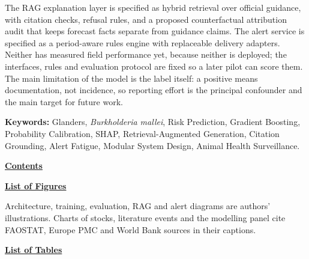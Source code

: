\documentclass[10pt,openany]{report}
\begin{document}
\vspace{0.5em}
\noindent
The RAG explanation layer is specified as hybrid retrieval over official guidance, with citation
checks, refusal rules, and a proposed counterfactual attribution audit that keeps forecast facts
separate from guidance claims. The alert service is specified as a period-aware rules engine with
replaceable delivery adapters. Neither has measured field performance yet, because neither is
deployed; the interfaces, rules and evaluation protocol are fixed so a later pilot can score them.
The main limitation of the model is the label itself: a positive means documentation, not incidence,
so reporting effort is the principal confounder and the main target for future work.

\vspace{0.7em}
\noindent
\textbf{Keywords:} Glanders, \textit{Burkholderia mallei}, Risk Prediction, Gradient Boosting,
Probability Calibration, SHAP, Retrieval-Augmented Generation, Citation Grounding, Alert Fatigue,
Modular System Design, Animal Health Surveillance.

\newpage
\pagestyle{plain}
\noindent\underline{\textbf{Contents}}
\vspace{0.55cm}

\makeatletter
{}
\makeatother

\newpage
\noindent\underline{\textbf{List of Figures}}
\vspace{0.55cm}

{\small
Architecture, training, evaluation, RAG and alert diagrams are authors' illustrations.
Charts of stocks, literature events and the modelling panel cite FAOSTAT, Europe PMC and
World Bank sources in their captions.
\par}
\vspace{0.45cm}

\makeatletter
{}
\makeatother

\newpage
\noindent\underline{\textbf{List of Tables}}
\vspace{0.55cm}

\makeatletter
{}
\makeatother

\end{document}
